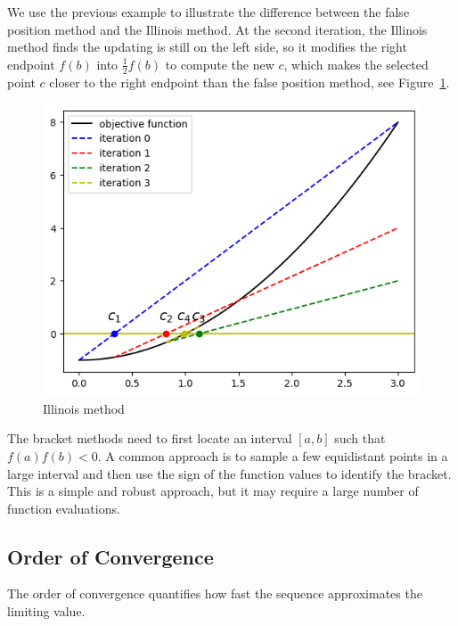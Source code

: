 \begin{remark}
We use the previous example to illustrate the difference between the false position method and the Illinois method. At the second iteration, the Illinois method finds the updating is still on the left side, so it modifies the right endpoint $f(b)$ into $\frac{1}{2} f(b)$ to compute the new $c$, which makes the selected point ${c}$ closer to the right endpoint than the false position method, see Figure~\ref{FIG: 0-RO-FI-IL}.

\begin{figure}[!htb]
    \centering
\includegraphics[scale=0.6]{Figures/root_finding_img_1.png}
    \caption{Illinois method}
    \label{FIG: 0-RO-FI-IL}
\end{figure}
\end{remark}

\begin{remark}
    The bracket methods need to first locate an interval $[a, b]$ such that $f(a)f(b) < 0$. A common approach is to sample a few equidistant points in a large interval and then use the sign of the function values to identify the bracket. This is a simple and robust approach, but it may require a large number of function evaluations.
\end{remark}

\subsection{Order of Convergence}
The order of convergence quantifies how fast the sequence approximates the limiting value.

